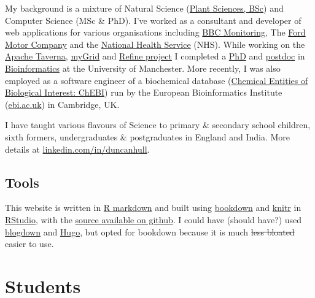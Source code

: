 \documentclass[12pt,]{book}
\begin{document}
My background is a mixture of Natural Science (\href{http://www.plantsciences.manchester.ac.uk/}{Plant Sciences, BSc}) and Computer Science (MSc \& PhD). I've worked as a consultant and developer of web applications for various organisations including \href{https://en.wikipedia.org/wiki/BBC_Monitoring}{BBC Monitoring}, The \href{https://en.wikipedia.org/wiki/Ford_Motor_Company}{Ford Motor Company} and the \href{https://en.wikipedia.org/wiki/National_Health_Service}{National Health Service} (NHS). While working on the \href{https://en.wikipedia.org/wiki/Apache_Taverna}{Apache Taverna}, \href{https://en.wikipedia.org/wiki/MyGrid}{myGrid} and \href{http://www.nactem.ac.uk/pathtext/}{Refine project} I completed a \href{https://ethos.bl.uk/OrderDetails.do?uin=uk.bl.ethos.497578}{PhD} and \href{https://en.wikipedia.org/wiki/Postdoctoral_researcher}{postdoc} in \href{https://en.wikipedia.org/wiki/Bioinformatics}{Bioinformatics} at the University of Manchester. More recently, I was also employed as a software engineer of a biochemical database (\href{https://www.ebi.ac.uk/chebi/}{Chemical Entities of Biological Interest: ChEBI}) run by the European Bioinformatics Institute (\href{https://www.ebi.ac.uk}{ebi.ac.uk}) in Cambridge, UK.

I have taught various flavours of Science to primary \& secondary school children, sixth formers, undergraduates \& postgraduates in England and India. More details at \href{https://uk.linkedin.com/in/duncanhull}{linkedin.com/in/duncanhull}.

\hypertarget{tools}{%
\section*{Tools}\label{tools}}

This website is written in \href{https://rmarkdown.rstudio.com/}{R markdown} and built using \href{https://bookdown.org}{bookdown} and \href{https://en.wikipedia.org/wiki/Knitr}{knitr} in \href{https://www.rstudio.com/}{RStudio}, with the \href{https://github.com/dullhunk/hulled}{source available on github}. I could have (should have?) used \href{https://bookdown.org/yihui/blogdown/}{blogdown} and \href{https://gohugo.io}{Hugo}, but opted for bookdown because it is much \sout{less bloated} easier to use. 🔨

\hypertarget{teaching}{%
\chapter{Students}\label{teaching}}
\end{document}
